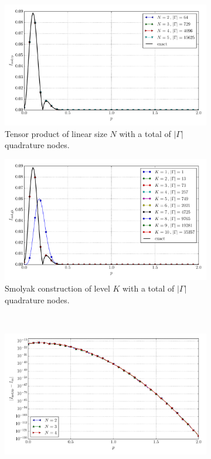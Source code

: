 \documentclass[a4paper,10pt]{article}
\begin{document}
\begin{figure}[ht!]
  \begin{subfigure}[t]{0.5\linewidth}
    \includegraphics[width=\linewidth]{./plots/tp_sg_6d_conv_p_(1,0,1,0,0,0)_(1,1,0,0,0,0)_val_nsd_tp.pdf}
    \caption{Tensor product of linear size $N$ with a total of $|\Gamma|$ quadrature nodes.}
    \label{fig:tp_sg_6d_conv_p_101000_110000_val_nsd_tp}
  \end{subfigure}
  \begin{subfigure}[t]{0.5\linewidth}
    \includegraphics[width=\linewidth]{./plots/tp_sg_6d_conv_p_(1,0,1,0,0,0)_(1,1,0,0,0,0)_val_nsd_gk.pdf}
    \caption{Smolyak construction of level $K$ with a total of $|\Gamma|$ quadrature nodes.}
    \label{fig:tp_sg_6d_conv_p_101000_110000_val_nsd_gk}
  \end{subfigure} \\
  \begin{subfigure}[t]{0.5\linewidth}
    \includegraphics[width=\linewidth]{./plots/tp_sg_6d_conv_p_(1,0,1,0,0,0)_(1,1,0,0,0,0)_err_nsd_tp.pdf}

\end{subfigure}
\end{figure}
\end{document}
